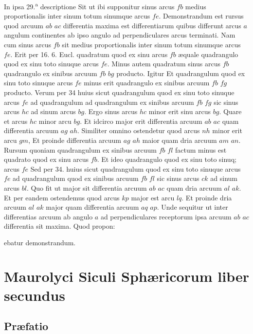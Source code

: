 \documentclass[11pt,a4paper]{article}
\begin{document}
In ipsa 29.\textsuperscript{a} descriptione Sit ut ibi supponitur sinus arcus $fb$ medius proportionalis inter sinum totum sinumque arcus $fe$. Demonstrandum est rursus quod arcuum $ab$ $ac$ differentia maxima est differentiarum quibus differunt arcus $a$ angulum continentes ab ipso angulo ad perpendiculares arcus terminati. Nam cum sinus arcus $fb$ sit medius proportionalis inter sinum totum sinumque arcus $fe$. Erit per 16. 6. Eucl. quadratum quod ex sinu arcus $fb$ æquale quadrangulo quod ex sinu toto sinuque arcus $fe$. Minus autem  quadratum sinus arcus $fb$ quadrangulo ex sinibus arcuum $fb$ $bg$ producto. Igitur Et quadrangulum quod ex sinu toto sinuque arcus $fe$ minus erit quadrangulo ex sinibus arcuum $fb$ $fg$ producto. Verum per 34 huius sicut quadrangulum quod ex sinu toto sinuque arcus $fe$ ad quadrangulum ad quadrangulum ex sinibus arcuum $fb$ $fg$ sic sinus arcus $hc$ ad sinum arcus $bg$. Ergo sinus arcus $hc$ minor erit sinu arcus $bg$. Quare et arcus $hc$ minor arcu $bg$. Et idcirco major erit differentia arcuum $ab$ $ac$ quam differentia arcuum $ag$ $ah$. Similiter omnino ostendetur quod arcus $nh$ minor erit arcu $gm$, Et proinde differentia arcuum $ag$ $ah$ maior quam dria arcuum  $am$ $an$. Rursum quoniam quadrangulum ex sinibus arcuum $fb$ $fl$ factum minus est quadrato quod ex sinu arcus $fb$. Et ideo quadrangulo quod ex sinu toto sinuq; arcus $fe$ Sed per 34. huius sicut quadrangulum quod ex sinu toto sinuque arcus $fe$ ad quadrangulum quod ex sinibus arcuum $fb$ $fl$ sic sinus arcus $ck$ ad sinum arcus $bl$. Quo fit ut major sit differentia arcuum $ab$ $ac$ quam dria arcuum $al$ $ak$. Et per eandem ostendemus quod arcus $kp$ major est arcu $lq$. Et proinde dria arcuum $al$ $ak$ major quam differentia arcuum $aq$ $ap$. Unde sequitur ut inter differentias arcuum ab angulo $a$ ad perpendiculares receptorum ipsa arcuum $ab$ $ac$ differentia sit maxima. Quod propon:

ebatur demonstrandum.

\section*{Maurolyci Siculi Sphæricorum liber secundus}

\subsection*{Præfatio}
\end{document}
